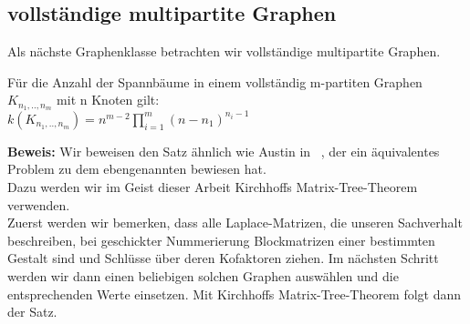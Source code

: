\subsection{vollständige multipartite Graphen}
 
Als nächste Graphenklasse betrachten wir vollständige multipartite Graphen.

\begin{Tms}
 Für die Anzahl der Spannbäume in einem vollständig m-partiten Graphen $K_{n_1,..,n_m}$ mit n Knoten gilt:\\
 $\mathit{k}(K_{n_1,..,n_m})=n^{m-2}\prod_{i=1}^{m}(n-n_1)^{n_i-1}$
\end{Tms}
\textbf{Beweis:}
Wir beweisen den Satz ähnlich wie Austin in ~\cite{austin_1960}, der ein äquivalentes Problem zu dem ebengenannten bewiesen hat.\\
Dazu werden wir im Geist dieser Arbeit Kirchhoffs Matrix-Tree-Theorem verwenden.\\
Zuerst werden wir bemerken, dass alle Laplace-Matrizen, die unseren Sachverhalt beschreiben, bei geschickter Nummerierung Blockmatrizen einer bestimmten Gestalt sind und Schlüsse über deren Kofaktoren  ziehen. Im nächsten Schritt werden wir dann einen beliebigen solchen Graphen auswählen und die entsprechenden Werte einsetzen. Mit Kirchhoffs Matrix-Tree-Theorem folgt dann der Satz.\\


